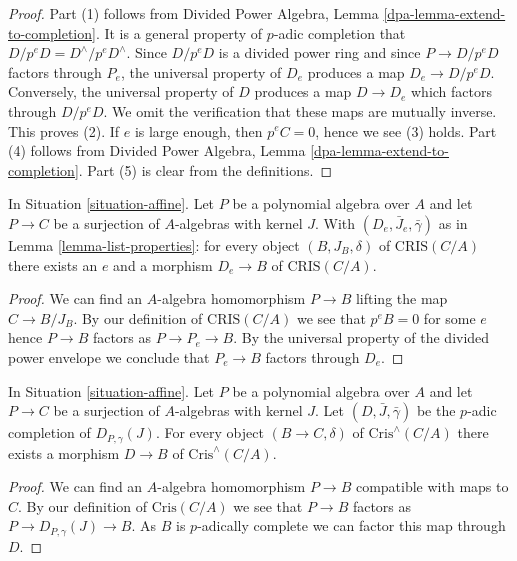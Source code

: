 \begin{proof}
Part (1) follows from
Divided Power Algebra, Lemma \ref{dpa-lemma-extend-to-completion}.
It is a general property of $p$-adic completion that
$D/p^eD = D^\wedge/p^eD^\wedge$. Since $D/p^eD$ is a divided power ring
and since $P \to D/p^eD$ factors through $P_e$, the universal property of
$D_e$ produces a map $D_e \to D/p^eD$. Conversely, the universal property
of $D$ produces a map $D \to D_e$ which factors through $D/p^eD$. We omit
the verification that these maps are mutually inverse. This proves (2).
If $e$ is large enough, then $p^eC = 0$, hence we see (3) holds.
Part (4) follows from
Divided Power Algebra, Lemma \ref{dpa-lemma-extend-to-completion}.
Part (5) is clear from the definitions.
\end{proof}

\begin{lemma}
\label{lemma-set-generators}
In Situation \ref{situation-affine}.
Let $P$ be a polynomial algebra over $A$ and let
$P \to C$ be a surjection of $A$-algebras with kernel $J$.
With $(D_e, \bar J_e, \bar\gamma)$ as in Lemma \ref{lemma-list-properties}:
for every object $(B, J_B, \delta)$ of $\text{CRIS}(C/A)$ there
exists an $e$ and a morphism $D_e \to B$ of $\text{CRIS}(C/A)$.
\end{lemma}

\begin{proof}
We can find an $A$-algebra homomorphism $P \to B$
lifting the map $C \to B/J_B$. By our definition of
$\text{CRIS}(C/A)$ we see that $p^eB = 0$ for
some $e$ hence $P \to B$ factors as $P \to P_e \to B$.
By the universal property of the divided power envelope we
conclude that $P_e \to B$ factors through $D_e$.
\end{proof}

\begin{lemma}
\label{lemma-generator-completion}
In Situation \ref{situation-affine}.
Let $P$ be a polynomial algebra over $A$ and let
$P \to C$ be a surjection of $A$-algebras with kernel $J$.
Let $(D, \bar J, \bar\gamma)$ be the $p$-adic completion of
$D_{P, \gamma}(J)$. For every object $(B \to C, \delta)$ of
$\text{Cris}^\wedge(C/A)$ there
exists a morphism $D \to B$ of $\text{Cris}^\wedge(C/A)$.
\end{lemma}

\begin{proof}
We can find an $A$-algebra homomorphism $P \to B$ compatible
with maps to $C$. By our definition of
$\text{Cris}(C/A)$ we see that $P \to B$ factors as
$P \to D_{P, \gamma}(J) \to B$. As $B$ is $p$-adically complete
we can factor this map through $D$.
\end{proof}



